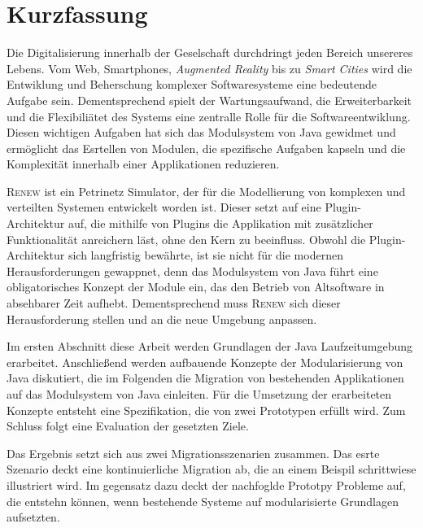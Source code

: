 


 
\newpage


\chapter*{Kurzfassung}
Die Digitalisierung innerhalb der Geselschaft durchdringt jeden Bereich unsereres Lebens. Vom Web, Smartphones, \textit{Augmented Reality} bis zu \textit{Smart Cities} wird die Entwiklung und Beherschung komplexer Softwaresysteme eine bedeutende Aufgabe sein. Dementsprechend spielt der Wartungsaufwand, die Erweiterbarkeit und die Flexibiliätet des Systems eine zentralle Rolle für die Softwareentwiklung. Diesen wichtigen Aufgaben hat sich das Modulsystem von Java gewidmet und ermöglicht das Esrtellen von Modulen, die spezifische Aufgaben kapseln und die Komplexität innerhalb einer Applikationen reduzieren.\bigbreak

\textsc{Renew} ist ein Petrinetz Simulator, der für die Modellierung von komplexen und verteilten Systemen entwickelt worden ist. Dieser setzt auf eine Plugin-Architektur auf, die mithilfe von Plugins die Applikation mit zusätzlicher Funktionalität anreichern läst, ohne den Kern zu beeinfluss.\newline
Obwohl die Plugin-Architektur sich langfristig bewährte, ist sie nicht für die modernen Herausforderungen gewappnet, denn das Modulsystem von Java führt eine obligatorisches Konzept der Module ein, das den Betrieb von Altsoftware 
in absehbarer Zeit aufhebt. Dementsprechend muss \textsc{Renew} sich dieser Herausforderung stellen und an die neue Umgebung anpassen. \bigbreak

Im ersten Abschnitt diese Arbeit werden Grundlagen der Java Laufzeitumgebung erarbeitet. Anschließend werden aufbauende Konzepte der Modularisierung von Java diskutiert, die im Folgenden die Migration von bestehenden Applikationen auf das Modulsystem von Java einleiten. Für die Umsetzung der erarbeiteten Konzepte entsteht eine Spezifikation, die von zwei Prototypen erfüllt wird. Zum Schluss folgt eine Evaluation der gesetzten Ziele.\bigbreak

Das Ergebnis setzt sich aus zwei Migrationsszenarien zusammen. Das esrte Szenario deckt eine kontinuierliche Migration ab, die an einem Beispil schrittwiese illustriert wird. Im gegensatz dazu deckt der nachfoglde Prototpy Probleme auf, die entstehn können, wenn bestehende Systeme auf modularisierte Grundlagen aufsetzten.\bigbreak

